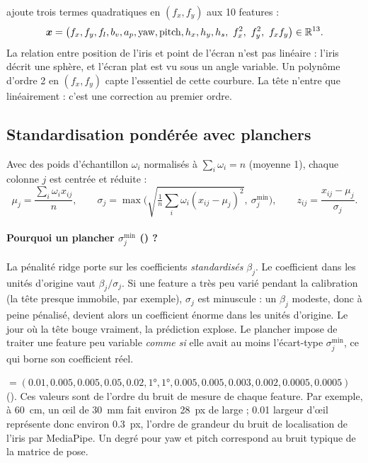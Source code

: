  ajoute trois termes quadratiques en $(f_x, f_y)$ aux 10 features :
\begin{equation}
  \vect{x} = \big(f_x, f_y, f_l, b_v, a_p, \text{yaw}, \text{pitch}, h_x, h_y, h_s,\ f_x^2,\ f_y^2,\ f_x f_y\big) \in \R^{13}.
\end{equation}
La relation entre position de l'iris et point de l'écran n'est pas linéaire : l'iris décrit une sphère, et l'écran plat est vu sous un angle variable. Un polynôme d'ordre 2 en $(f_x, f_y)$ capte l'essentiel de cette courbure. La tête n'entre que linéairement : c'est une correction au premier ordre.

\subsection{Standardisation pondérée avec planchers}

Avec des poids d'échantillon $\omega_i$ normalisés à $\sum_i \omega_i = n$ (moyenne 1), chaque colonne $j$ est centrée et réduite :
\begin{equation}
  \mu_j = \frac{\sum_i \omega_i x_{ij}}{n}, \qquad
  \sigma_j = \max\!\Big(\sqrt{\tfrac{1}{n}\textstyle\sum_i \omega_i (x_{ij} - \mu_j)^2},\ \sigma_j^\text{min}\Big), \qquad
  z_{ij} = \frac{x_{ij} - \mu_j}{\sigma_j}.
\end{equation}

\paragraph{Pourquoi un plancher $\sigma_j^\text{min}$ () ?} La pénalité ridge porte sur les coefficients \emph{standardisés} $\beta_j$. Le coefficient dans les unités d'origine vaut $\beta_j / \sigma_j$. Si une feature a très peu varié pendant la calibration (la tête presque immobile, par exemple), $\sigma_j$ est minuscule : un $\beta_j$ modeste, donc à peine pénalisé, devient alors un coefficient énorme dans les unités d'origine. Le jour où la tête bouge vraiment, la prédiction explose. Le plancher impose de traiter une feature peu variable \emph{comme si} elle avait au moins l'écart-type $\sigma_j^\text{min}$, ce qui borne son coefficient réel.

\begin{origine}
 $= (\num{0.01}, \num{0.005}, \num{0.005}, \num{0.05}, \num{0.02}, \ang{1}, \ang{1}, \num{0.005}, \num{0.005}, \num{0.003}, \num{0.002}, \num{0.0005}, \num{0.0005})$ (\empi). Ces valeurs sont de l'ordre du bruit de mesure de chaque feature. Par exemple, à \qty{60}{\centi\metre}, un œil de \qty{30}{\milli\metre} fait environ \qty{28}{px} de large ; \num{0.01} largeur d'œil représente donc environ \qty{0.3}{px}, l'ordre de grandeur du bruit de localisation de l'iris par MediaPipe. Un degré pour yaw et pitch correspond au bruit typique de la matrice de pose.
\end{origine}

